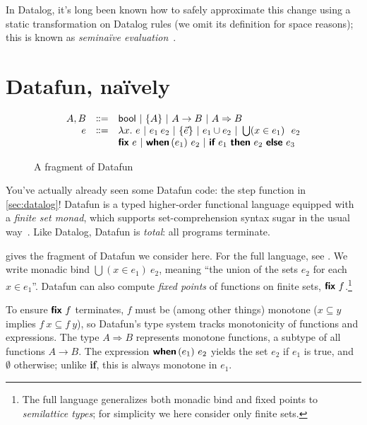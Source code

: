 \documentclass[sigplan,screen,dvipsnames]{acmart}
\newcommand{\naive}{na\"ive}
\newcommand{\bnfeq}{\dblcolon=}
\newcommand{\bnfcont}{}
\newcommand{\pipe}{~|~}
\newcommand{\fn}{\lambda}
\newcommand{\binder}{.~}
\newcommand{\bind}[1]{#1\binder}
\newcommand{\fnof}[1]{\fn\bind{#1}}
\newcommand{\kw}[1]{\textsf{\bfseries #1}}
\newcommand{\tlv}[1]{\textsf{#1}}
\newcommand{\mto}{\overset{+}{\to}}
\renewcommand{\mto}{\Rightarrow}
\newcommand{\tset}[1]{\{#1\}}
\newcommand{\tbool}{\textsf{bool}}
\newcommand{\eset}[1]{\{#1\}}
\newcommand{\ewhen}[1]{\kw{when}\,(#1)~}
\newcommand{\eif}[2]{\kw{if}~#1~\kw{then}~#2~\kw{else}~}
\newcommand{\efor}[1]{\bigcup(#1)~}
\newcommand{\efix}{\kw{fix}~}
\begin{document}
In Datalog, it's long been known how to safely approximate this change using a
static transformation on Datalog rules (we omit its definition for space
reasons); this is known as \emph{semi\naive{}
  evaluation}~\citep{bancilhon85,bancilhon86}.


\section{Datafun, na\"ively}


\begin{figure}
  \[
  \begin{array}{rcl}
    A,B &\bnfeq& \tbool \pipe \tset{A} \pipe A \to B \pipe A \mto B
    \\
    e &\bnfeq& \fnof{x} e \pipe e_1\:e_2 \pipe \eset{\vec{e}} \pipe e_1 \cup e_2
    \pipe \efor{x \in e_1}~ e_2
    \\ &\bnfcont&  \efix e \pipe \ewhen{e_1} e_2 \pipe \eif{e_1}{e_2}{e_3}
  \end{array}
  \]\vspace{-1em}
  \caption{A fragment of Datafun}
  \label{fig:datafun}
\end{figure}

You've actually already seen some Datafun code: the \tlv{step} function in
\cref{sec:datalog}! Datafun is a typed higher-order functional language equipped
with a \emph{finite set monad}, which supports set-comprehension syntax sugar in
the usual way~\cite{comprehending-monads}. Like Datalog, Datafun is
\emph{total}: all programs terminate.

 gives the fragment of Datafun we consider here. For the full
language, see \citet{datafun}. We write monadic bind $\efor{x \in e_1} e_2$,
meaning ``the union of the sets $e_2$ for each $x \in e_1$''.
%
Datafun can also compute \emph{fixed points} of functions on finite sets, $\efix
f$.\footnote{The full language generalizes both monadic bind and fixed points to
  \emph{semilattice types}; for simplicity we here consider only finite sets.}

To ensure $\efix f$ terminates, $f$ must be (among other things) monotone ($x
\subseteq y$ implies $f\:x \subseteq f\:y$), so Datafun's type system tracks
monotonicity of functions and expressions.
%
The type $A \mto B$ represents monotone functions, a subtype of all functions $A
\to B$. The expression $\ewhen{e_1}{e_2}$ yields the set $e_2$ if $e_1$ is true,
and $\emptyset$ otherwise; unlike \kw{if}, this is always monotone in $e_1$.
\end{document}
